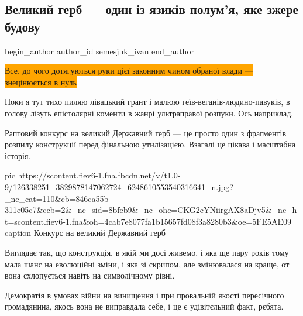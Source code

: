  
 
 
 
 
\subsection{Великий герб --- один із язиків полум'я, яке зжере будову}
\label{sec:20_11_2020.news.ua.gazeta.semesjuk_ivan.1.gerb}
\ifcmt
	begin_author
   author_id semesjuk_ivan
	end_author
\fi

\begin{center}
  \begin{fminipage}{\textwidth}
		\color{blue}
		\colorbox{orange}{
Все, до чого дотягуються руки цієї законним чином обраної влади --- знецінюється в нуль
		}
  \end{fminipage}
\end{center}
  
Поки я тут тихо пиляю лівацький грант і малюю геїв-веганів-людино-павуків, в
голову лізуть епістолярні коменти в жанрі ультраправої розпуки. Ось наприклад.

Раптовий конкурс на великий Державний герб --- це просто один з фрагментів
розпилу конструкції перед фінальною утилізацією. Взагалі це цікава і масштабна
історія.

\ifcmt
pic https://scontent.fiev6-1.fna.fbcdn.net/v/t1.0-9/126338251_3829878147062724_6248610553540316641_n.jpg?_nc_cat=110&cb=846ca55b-311e05c7&ccb=2&_nc_sid=8bfeb9&_nc_ohc=CKG2cYNiirgAX8aDjv5&_nc_ht=scontent.fiev6-1.fna&oh=4cab7e8077fa1b15657fd08f3a8280b3&oe=5FE5AE09
caption Конкурс на великий Державний герб
\fi

Виглядає так, що конструкція, в якій ми досі живемо, і яка ще пару років тому
мала шанс на еволюційні зміни, і яка зі скрипом, але змінювалася на краще, от
вона схлопується навіть на символічному рівні.

Демократія в умовах війни на винищення і при провальній якості пересічного
громадянина, якось вона не виправдала себе, і це є удівітєльний факт, рєбята.

